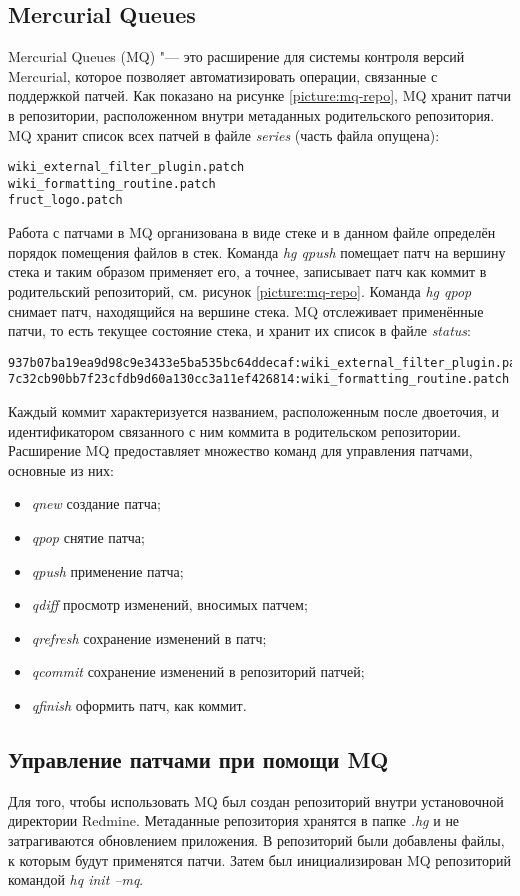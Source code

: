 \subsection{Mercurial Queues}
Mercurial Queues (MQ) "--- это расширение для системы контроля версий
Mercurial, которое позволяет автоматизировать операции, связанные с поддержкой
патчей. Как показано на рисунке \ref{picture:mq-repo}, MQ хранит патчи в
репозитории, расположенном внутри метаданных родительского репозитория. MQ
хранит список всех патчей в файле \textit{series} (часть файла опущена):
\small{\begin{lstlisting}
wiki_external_filter_plugin.patch
wiki_formatting_routine.patch
fruct_logo.patch
\end{lstlisting}}
Работа с патчами в MQ организована в виде стеке и в данном файле определён
порядок помещения файлов в стек. Команда \textit{hg qpush} помещает патч на
вершину стека и таким образом применяет его, а точнее, записывает патч как
коммит в родительский репозиторий, см. рисунок \ref{picture:mq-repo}. Команда
\textit{hg qpop} снимает патч, находящийся на вершине стека. MQ отслеживает
применённые патчи, то есть текущее состояние стека, и хранит их список в файле
\textit{status}:
\small{\begin{lstlisting}
937b07ba19ea9d98c9e3433e5ba535bc64ddecaf:wiki_external_filter_plugin.patch
7c32cb90bb7f23cfdb9d60a130cc3a11ef426814:wiki_formatting_routine.patch
\end{lstlisting}}
Каждый коммит характеризуется названием, расположенным после двоеточия, и
идентификатором связанного с ним коммита в родительском репозитории.
Расширение MQ предоставляет множество команд для управления патчами, основные
из них:
\begin{itemize}
  \item \textit{qnew} создание патча;
  \item \textit{qpop} снятие патча;
  \item \textit{qpush} применение патча;
  \item \textit{qdiff} просмотр изменений, вносимых патчем;
  \item \textit{qrefresh} сохранение изменений в патч;
  \item \textit{qcommit} сохранение изменений в репозиторий патчей;
  \item \textit{qfinish} оформить патч, как коммит.
\end{itemize}

\subsection{Управление патчами при помощи MQ}
Для того, чтобы использовать MQ был создан репозиторий внутри
установочной директории Redmine. Метаданные репозитория хранятся в папке
\textit{.hg} и не затрагиваются обновлением приложения. В репозиторий
были добавлены файлы, к которым будут применятся патчи. Затем был
инициализирован MQ репозиторий командой \textit{hq init --mq}.


